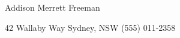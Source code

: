\documentclass[pt,a4]{article}
\begin{document}
\scshape
\centerline{ {\Huge Addison Merrett Freeman} }
\centerline{42 Wallaby Way \textbullet \hspace{5pt} Sydney, NSW \textbullet \hspace{5pt} (555) 011-2358 }
\end{document}

